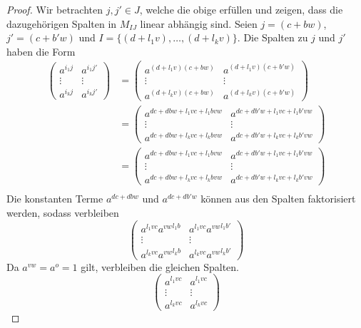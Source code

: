 {

\begin{proof}
    Wir betrachten $j,j' \in J$, welche die obige  erfüllen und zeigen, dass die dazugehörigen Spalten in $M_{IJ}$ linear abhängig sind. Seien $j = (c + bw)$, $j' = (c + b'w)$ und $I = \{(d+l_1v),\dots,(d+l_kv)\}$. Die Spalten zu $j$ und $j'$ haben die Form
    \begin{align*}
        \begin{pmatrix}
            a^{i_1j} & a^{i_1j'} \\
            \vdots & \vdots \\
            a^{i_kj} & a^{i_kj'}
        \end{pmatrix} &=
        \begin{pmatrix}
            a^{(d+l_1v)(c + bw)} & a^{(d+l_1v)(c + b'w)} \\
            \vdots & \vdots \\
            a^{(d+l_kv)(c + bw)} & a^{(d+l_kv)(c + b'w)}
        \end{pmatrix} \\
        &= \begin{pmatrix}
            a^{dc + dbw +l_1vc + l_1bvw} & a^{dc + db'w +l_1vc + l_1b'vw} \\
            \vdots & \vdots \\
            a^{dc + dbw +l_kvc + l_kbvw} & a^{dc + db'w +l_kvc + l_kb'vw}
        \end{pmatrix} \\
        &= \begin{pmatrix}
            a^{dc + dbw +l_1vc + l_1bvw} & a^{dc + db'w +l_1vc + l_1b'vw} \\
            \vdots & \vdots \\
            a^{dc + dbw +l_kvc + l_kbvw} & a^{dc + db'w +l_kvc + l_kb'vw}
        \end{pmatrix} \\
    \end{align*}
    Die konstanten Terme $a^{dc + dbw}$ und $a^{dc + db'w}$ können aus den Spalten faktorisiert werden, sodass verbleiben
    \begin{equation*}
        \begin{pmatrix}
            a^{l_1vc} {a^{vw}}^{l_1b} & a^{l_1vc} {a^{vw}}^{l_1b'} \\
            \vdots & \vdots \\
            a^{l_kvc} {a^{vw}}^{l_kb} & a^{l_kvc} {a^{vw}}^{l_kb'}
        \end{pmatrix}
    \end{equation*}
    Da $a^{vw} = a^{o} = 1$ gilt, verbleiben die gleichen Spalten.
    \begin{equation*}
        \begin{pmatrix}
            a^{l_1vc} & a^{l_1vc} \\
            \vdots & \vdots \\
            a^{l_kvc} & a^{l_kvc}
        \end{pmatrix}
    \end{equation*}


\end{proof}}
